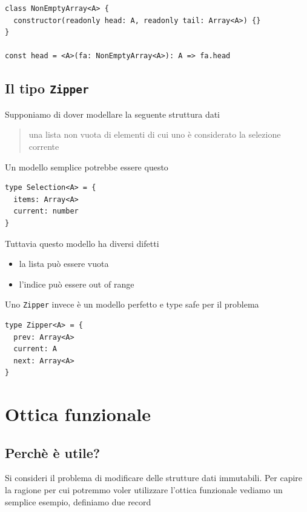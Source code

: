 \documentclass[12pt]{article}
\begin{document}
\begin{verbatim}
class NonEmptyArray<A> {
  constructor(readonly head: A, readonly tail: Array<A>) {}
}

const head = <A>(fa: NonEmptyArray<A>): A => fa.head
\end{verbatim}

\subsection{Il tipo \texttt{Zipper}}

Supponiamo di dover modellare la seguente struttura dati

\begin{quote}
una lista non vuota di elementi di cui uno è considerato la selezione corrente
\end{quote}

Un modello semplice potrebbe essere questo

\begin{verbatim}
type Selection<A> = {
  items: Array<A>
  current: number
}
\end{verbatim}

Tuttavia questo modello ha diversi difetti

\begin{itemize}
  \item la lista può essere vuota
  \item l'indice può essere out of range
\end{itemize}

Uno \texttt{Zipper} invece è un modello perfetto e type safe per il problema

\begin{verbatim}
type Zipper<A> = {
  prev: Array<A>
  current: A
  next: Array<A>
}
\end{verbatim}

\section{Ottica funzionale}

\subsection{Perchè è utile?}

Si consideri il problema di modificare delle strutture dati immutabili.
Per capire la ragione per cui potremmo voler utilizzare l'ottica funzionale vediamo un semplice esempio, definiamo due record
\end{document}
